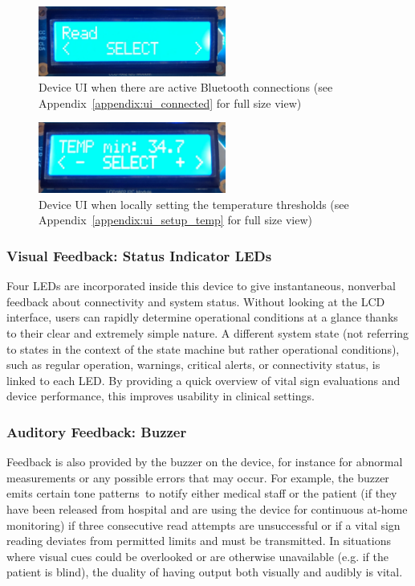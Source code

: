 \begin{figure}[H]
	\centering
	\includegraphics[width=0.55\textwidth]{images/device_ui_connected}
	\caption{Device UI when there are active Bluetooth connections (see Appendix~\ref{appendix:ui_connected} for full size view)}
	\label{fig:ui_connected}
\end{figure}

\begin{figure}[H]
	\centering
	\includegraphics[width=0.55\textwidth]{images/device_ui_set_temp}
	\caption{Device UI when locally setting the temperature thresholds (see Appendix~\ref{appendix:ui_setup_temp} for full size view)}
	\label{fig:ui_set_temp}
\end{figure}

\subsubsection{Visual Feedback: Status Indicator LEDs}
Four LEDs are incorporated inside this device to give instantaneous, nonverbal feedback about connectivity and system status. Without looking at the LCD interface, users can rapidly determine operational conditions at a glance thanks to their clear and extremely simple nature. A different system state (not referring to states in the context of the state machine but rather operational conditions), such as regular operation, warnings, critical alerts, or connectivity status, is linked to each LED. By providing a quick overview of vital sign evaluations and device performance, this improves usability in clinical settings.

\subsubsection{Auditory Feedback: Buzzer}
Feedback is also provided by the buzzer on the device, for instance for abnormal measurements or any possible errors that may occur. For example, the buzzer emits certain tone patterns to notify either medical staff or the patient (if they have been released from hospital and are using the device for continuous at-home monitoring) if three consecutive read attempts are unsuccessful or if a vital sign reading deviates from permitted limits and must be transmitted. In situations where visual cues could be overlooked or are otherwise unavailable (e.g. if the patient is blind), the duality of having output both visually and audibly is vital.

